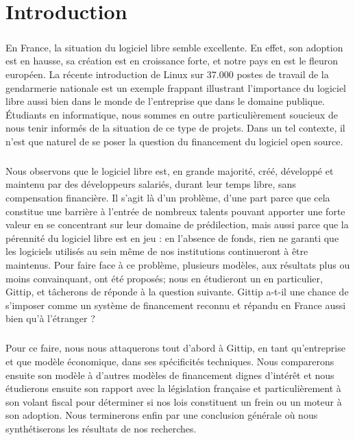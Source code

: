 \chapter*{Introduction}

\paragraph{}
En France, la situation du logiciel libre semble excellente.
En effet, son adoption est en hausse, sa création est en croissance forte,
et notre pays en est le fleuron européen.
La récente introduction de Linux sur 37.000 postes de travail de la
gendarmerie nationale est un exemple frappant illustrant l'importance
du logiciel libre aussi bien dans le monde de l'entreprise que dans
le domaine publique.
Étudiants en informatique, nous sommes en outre particulièrement soucieux
de nous tenir informés de la situation de ce type de projets.
Dans un tel contexte, il n'est que naturel de se poser la question du
financement du logiciel open source.

\paragraph{}
Nous observons que le logiciel libre est, en grande majorité, créé,
développé et maintenu par des développeurs salariés, durant leur temps
libre, sans compensation financière. Il s'agit là d'un problème, d'une
part parce que cela constitue une barrière à l'entrée de nombreux talents
pouvant apporter une forte valeur en se concentrant sur leur domaine de
prédilection, mais aussi parce que la pérennité du logiciel libre est en
jeu : en l'absence de fonds, rien ne garanti que les logiciels utilisés
au sein même de nos institutions continueront à être maintenus.
Pour faire face à ce problème, plusieurs modèles, aux résultats plus ou
moins convainquant, ont été proposés; nous en étudieront un en
particulier, Gittip, et tâcherons de réponde à la question suivante.
Gittip a-t-il une chance de s'imposer comme un système de financement
reconnu et répandu en France aussi bien qu'à l'étranger ?

\paragraph{}
Pour ce faire, nous nous attaquerons tout d'abord à Gittip, en tant
qu'entreprise et que modèle économique, dans ses spécificités techniques.
Nous comparerons ensuite son modèle à d'autres modèles de financement
dignes d'intérêt et nous étudierons ensuite son rapport avec la législation
française et particulièrement à son volant fiscal pour déterminer si nos
lois constituent un frein ou un moteur à son adoption.
Nous terminerons enfin par une conclusion générale où nous synthétiserons
les résultats de nos recherches.

